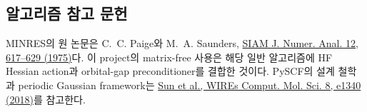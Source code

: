 \subsection{알고리즘 참고 문헌}

MINRES의 원 논문은 C.~C. Paige와 M.~A. Saunders,
\href{https://doi.org/10.1137/0712047}{SIAM J. Numer. Anal. 12, 617--629
(1975)}다. 이 project의 matrix-free 사용은 해당 일반 알고리즘에 HF Hessian action과
orbital-gap preconditioner를 결합한 것이다. PySCF의 설계 철학과 periodic Gaussian
framework는 \href{https://doi.org/10.1002/wcms.1340}{Sun et al., WIREs Comput.
Mol. Sci. 8, e1340 (2018)}를 참고한다.
